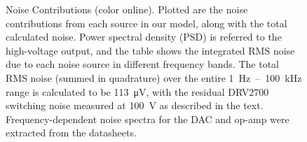 \documentclass[aip,rsi,reprint]{revtex4-1} %
\begin{document}
\begin{figure}[t]

\caption{Noise Contributions (color online). Plotted are the noise contributions from each source in our model, along with the total calculated noise. Power spectral density (PSD) is referred to the high-voltage output, and the table shows the integrated RMS noise due to each noise source in different frequency bands. The total RMS noise (summed in quadrature) over the entire \SI{1}{\hertz}~--~\SI{100}{\kilo\hertz} range is calculated to be \SI{113}{\micro\volt}, with the residual DRV2700 switching noise measured at \SI{100}{\volt} as described in the text. Frequency-dependent noise spectra for the DAC and op-amp were extracted from the datasheets.\label{Fig:NoisePlot}}
\end{figure} 
\end{document}
